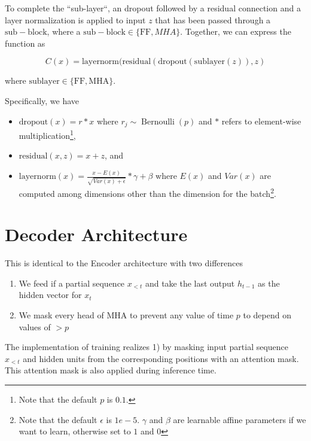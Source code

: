 
To complete the ``sub-layer``, an dropout followed by a residual connection and a layer normalization is applied to input $z$ that has been passed through a $\mathrm{sub-block}$, where a $\mathrm{sub-block} \in \{\mathrm{FF}, MHA\}$. Together, we can express the function as

\begin{equation}
C(x) = \mathrm{layernorm}(\mathrm{residual}(\mathrm{dropout}(\mathrm{sublayer}(z)), z)
\end{equation}

where $\mathrm{sublayer} \in \{\mathrm{FF}, \mathrm{MHA}\}$.


Specifically, we have
\begin{itemize}
    \item $\mathrm{dropout}(x) = r * x$ where $ r_j \sim \operatorname{Bernoulli}(p)$ and $*$ refers to element-wise multiplication\footnote{Note that the default $p$ is $0.1$.},
    \item $\mathrm{residual}(x, z) = x + z$, and 
    \item $\mathrm{layernorm}(x) = \frac{x-E(x)}{\sqrt{Var(x)+\epsilon}}*\gamma + \beta$ where $E(x)$ and $Var(x)$ are computed among dimensions other than the dimension for the batch\footnote{Note that the default $\epsilon$ is $1e-5$. $\gamma$ and $\beta$ are learnable affine parameters if we want to learn, otherwise set to $1$ and $0$}.
\end{itemize}


\section{Decoder Architecture}\label{sec:dec}

This is identical to the Encoder architecture with two differences

\begin{enumerate}
    \item We feed if a partial sequence $x_{<t}$ and take the last output $h_{t-1}$ as the hidden vector for $x_t$
    \item We mask every head of $\mathrm{MHA}$ to prevent any value of time $p$ to depend on values of $>p$
\end{enumerate}

The implementation of training realizes 1) by masking input partial sequence $x_{<t}$ and hidden units from the corresponding positions with an attention mask. This attention mask is also applied during inference time. 

